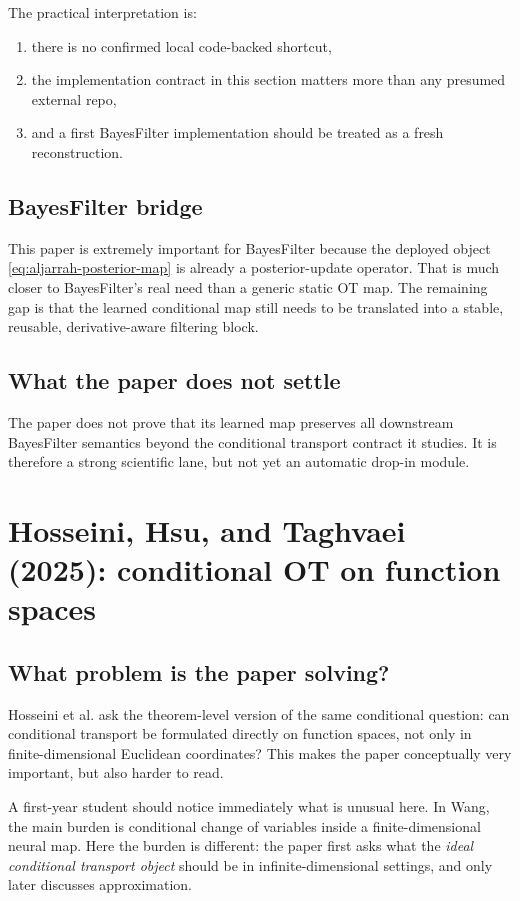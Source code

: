 \documentclass[11pt]{report}
\begin{document}
The practical interpretation is:
\begin{enumerate}[label=(\roman*)]
  \item there is no confirmed local code-backed shortcut,
  \item the implementation contract in this section matters more than any presumed external repo,
  \item and a first BayesFilter implementation should be treated as a fresh reconstruction.
\end{enumerate}

\subsection*{BayesFilter bridge}

This paper is extremely important for BayesFilter because the deployed object
\eqref{eq:aljarrah-posterior-map} is already a posterior-update operator.  That is
much closer to BayesFilter's real need than a generic static OT map.  The remaining
gap is that the learned conditional map still needs to be translated into a stable,
reusable, derivative-aware filtering block.

\subsection*{What the paper does not settle}

The paper does not prove that its learned map preserves all downstream BayesFilter
semantics beyond the conditional transport contract it studies.  It is therefore a
strong scientific lane, but not yet an automatic drop-in module.


\section{Hosseini, Hsu, and Taghvaei (2025): conditional OT on function spaces}

\subsection*{What problem is the paper solving?}

Hosseini et al. ask the theorem-level version of the same conditional question:
can conditional transport be formulated directly on function spaces, not only in
finite-dimensional Euclidean coordinates?  This makes the paper conceptually very
important, but also harder to read.

A first-year student should notice immediately what is unusual here.  In Wang, the
main burden is conditional change of variables inside a finite-dimensional neural
map.  Here the burden is different: the paper first asks what the \emph{ideal
conditional transport object} should be in infinite-dimensional settings, and only
later discusses approximation.
\end{document}
